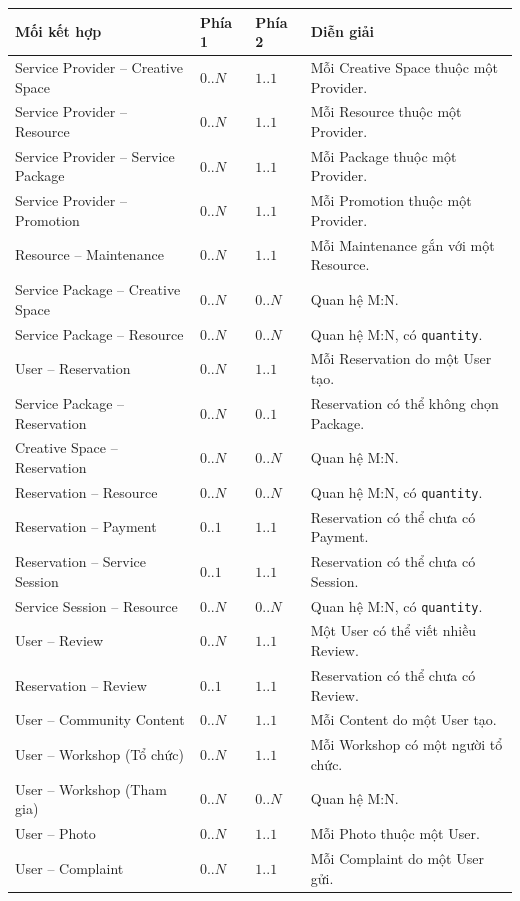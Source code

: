 \begin{center}
	\scriptsize
	\begin{tabular}{p{.31\linewidth} p{.16\linewidth} p{.16\linewidth} p{.27\linewidth}}
		\toprule
		\textbf{Mối kết hợp} & \textbf{Phía 1} & \textbf{Phía 2} & \textbf{Diễn giải} \\
		\midrule
		Service Provider -- Creative Space & $0..N$ & $1..1$ & Mỗi Creative Space thuộc một Provider. \\
		Service Provider -- Resource & $0..N$ & $1..1$ & Mỗi Resource thuộc một Provider. \\
		Service Provider -- Service Package & $0..N$ & $1..1$ & Mỗi Package thuộc một Provider. \\
		Service Provider -- Promotion & $0..N$ & $1..1$ & Mỗi Promotion thuộc một Provider. \\
		Resource -- Maintenance & $0..N$ & $1..1$ & Mỗi Maintenance gắn với một Resource. \\
		Service Package -- Creative Space & $0..N$ & $0..N$ & Quan hệ M:N. \\
		Service Package -- Resource & $0..N$ & $0..N$ & Quan hệ M:N, có \texttt{quantity}. \\
		User -- Reservation & $0..N$ & $1..1$ & Mỗi Reservation do một User tạo. \\
		Service Package -- Reservation & $0..N$ & $0..1$ & Reservation có thể không chọn Package. \\
		Creative Space -- Reservation & $0..N$ & $0..N$ & Quan hệ M:N. \\
		Reservation -- Resource & $0..N$ & $0..N$ & Quan hệ M:N, có \texttt{quantity}. \\
		Reservation -- Payment & $0..1$ & $1..1$ & Reservation có thể chưa có Payment. \\
		Reservation -- Service Session & $0..1$ & $1..1$ & Reservation có thể chưa có Session. \\
		Service Session -- Resource & $0..N$ & $0..N$ & Quan hệ M:N, có \texttt{quantity}. \\
		User -- Review & $0..N$ & $1..1$ & Một User có thể viết nhiều Review. \\
		Reservation -- Review & $0..1$ & $1..1$ & Reservation có thể chưa có Review. \\
		User -- Community Content & $0..N$ & $1..1$ & Mỗi Content do một User tạo. \\
		User -- Workshop (Tổ chức) & $0..N$ & $1..1$ & Mỗi Workshop có một người tổ chức. \\
		User -- Workshop (Tham gia) & $0..N$ & $0..N$ & Quan hệ M:N. \\
		User -- Photo & $0..N$ & $1..1$ & Mỗi Photo thuộc một User. \\
		User -- Complaint & $0..N$ & $1..1$ & Mỗi Complaint do một User gửi. \\
		\bottomrule
	\end{tabular}
\end{center}

